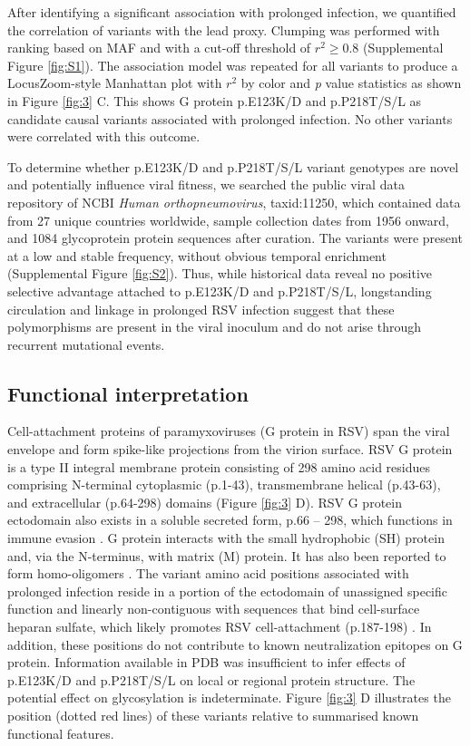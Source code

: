 \documentclass{article} %
\begin{document}
After identifying a significant association with prolonged infection,
we quantified the correlation of variants with the lead proxy.
Clumping was performed with ranking based on MAF and with a cut-off threshold of $r^2 \ge 0.8$ (Supplemental Figure \ref{fig:S1}).
The association model was repeated for all variants to produce a LocusZoom-style Manhattan plot with $r^2$ by color and \textit{p} value statistics as shown in 
Figure \ref{fig:3} C.
This shows G protein 
p.E123K/D and 
p.P218T/S/L as candidate causal variants associated with prolonged infection. 
No other variants were correlated with this outcome. 

To determine whether p.E123K/D and p.P218T/S/L variant genotypes are novel and potentially influence viral fitness, we searched  the public viral data repository of NCBI \textit{Human orthopneumovirus}, taxid:11250, which contained data from 
27 unique countries worldwide, sample collection dates from 1956 onward, and 1084 glycoprotein protein sequences after curation.
The variants were present at a low and stable frequency, without obvious temporal enrichment 
(Supplemental Figure \ref{fig:S2}).
Thus, while historical data reveal no positive selective advantage attached to p.E123K/D and p.P218T/S/L, longstanding circulation and linkage in prolonged RSV infection suggest that these polymorphisms are present in the viral inoculum and do not arise through recurrent mutational events.

\subsection{Functional interpretation}
Cell-attachment proteins of paramyxoviruses (G protein in RSV) span the viral envelope and form spike-like projections from the virion surface. 
RSV G protein is a type II integral membrane protein consisting of 298 amino acid residues comprising N-terminal cytoplasmic (p.1-43), transmembrane helical (p.43-63), and extracellular (p.64-298) domains 
(Figure \ref{fig:3} D). 
RSV G protein ectodomain also exists in a soluble secreted form, p.66 – 298, which functions in immune evasion 
\citep{levine1987demonstration, feldman1999identification, feldman2000fusion}.
G protein interacts with the small hydrophobic (SH) protein 
\citep{rixon2005respiratory}
and, via the N-terminus, with matrix (M) 
\citep{ghildyal2005interaction} 
protein.
It has also been reported to form homo-oligomers 
\citep{collins1992oligomerization}.
The variant amino acid positions associated with prolonged infection reside in a portion of the ectodomain of unassigned specific function and linearly non-contiguous with sequences that bind cell-surface heparan sulfate, which likely promotes RSV cell-attachment (p.187-198)
\citep{levine1987demonstration, feldman1999identification, feldman2000fusion}.
In addition, these positions do not contribute to known neutralization epitopes on G protein. Information available in PDB was insufficient to infer effects of p.E123K/D and p.P218T/S/L on local or regional protein structure. 
The potential effect on glycosylation is indeterminate. 
Figure \ref{fig:3} D illustrates the position (dotted red lines) of these variants relative to summarised known functional features.
\end{document}
